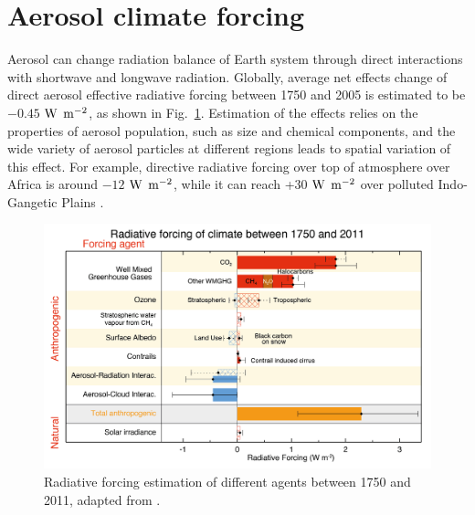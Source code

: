 \documentclass[edeposit,fullpage]{uiucthesis2009}
\begin{document}
\section{Aerosol climate forcing}
\label{cha1-2:aerosl-climate}
Aerosol can change radiation balance of Earth system through direct interactions with shortwave and longwave radiation. Globally, average net effects change of direct aerosol effective radiative forcing between 1750 and 2005 is estimated to be $-0.45$ $\rm W$ $\rm m^{-2}$, as shown in Fig.~\ref{fig:chap1-aerosol-climate}. Estimation of the effects relies on the properties of aerosol population, such as size and chemical components, and the wide variety of aerosol particles at different regions leads to spatial variation of this effect. For example, directive radiative forcing over top of atmosphere over Africa is around $-12$ $\rm W$ $\rm m^{-2}$, while it can reach +$30$ $\rm W$ $\rm m^{-2}$ over polluted Indo-Gangetic Plains \citep{subba2020recent}. 

\begin{figure}
	\centering
	\includegraphics[scale=0.80]{chap1_figs/thesis_chap1_fig1.jpeg}
	\caption{Radiative forcing estimation of different agents between 1750 and 2011, adapted from \citet{IPCC_CHAPTER8}.}
	\label{fig:chap1-aerosol-climate}
\end{figure}
\end{document}
